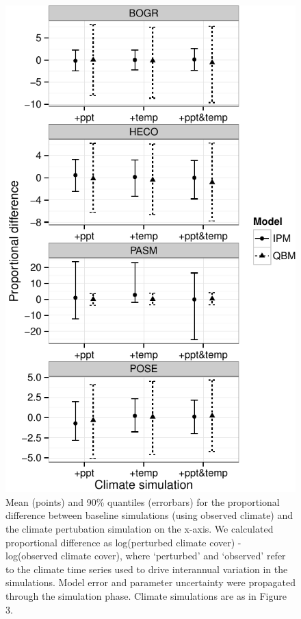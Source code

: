 \documentclass[12pt,]{article}
\begin{document}
\begin{figure}[htbp]
\centering
\includegraphics{components/figure/manuscript-figure_6.pdf}
\caption{Mean (points) and 90\% quantiles (errorbars) for the
proportional difference between baseline simulations (using observed
climate) and the climate pertubation simulation on the x-axis. We
calculated proportional difference as log(perturbed climate cover) -
log(observed climate cover), where `perturbed' and `observed' refer to
the climate time series used to drive interannual variation in the
simulations. Model error and parameter uncertainty were propagated
through the simulation phase. Climate simulations are as in Figure 3.}
\end{figure}
\end{document}
